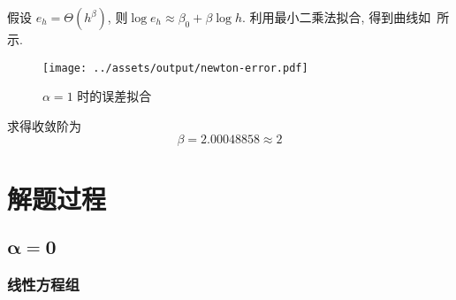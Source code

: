 \documentclass{nedsart}
\begin{document}
假设 $e_h = \Theta(h^\beta)$, 则$\log e_h \approx \beta_0 + \beta \log h$. 利用最小二乘法拟合, 得到曲线如~所示.
\begin{figure}[H]
    \centering
    \texttt{[image: ../assets/output/newton-error.pdf]}
    \caption{$\alpha = 1$ 时的误差拟合}\label{fig:newton-error}
\end{figure}\noindent
求得收敛阶为
\begin{equation}
    \beta = 2.00048858 \approx 2
\end{equation}

\section{解题过程}

\subsection[\texorpdfstring{$\alpha = 0$}{alpha=0}]{$\bm{\alpha = 0}$}

\subsubsection{线性方程组}
\end{document}
